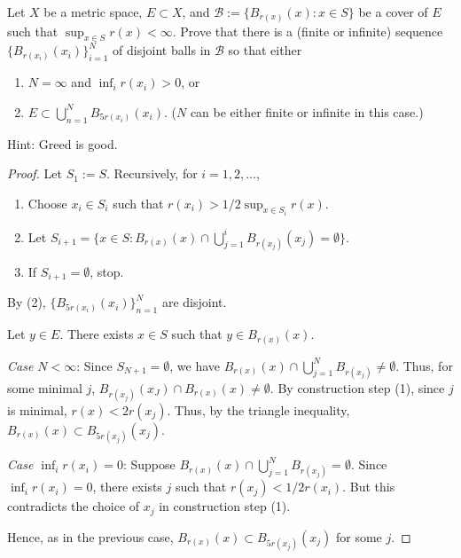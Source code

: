 \documentclass{article}
\begin{document}
 Let $X$ be a metric space, $E\subset X$, and $\mathcal B := \{B_{r(x)}(x) : x \in S \}$ be a cover of $E$ such that $\sup_{x\in S} r(x) < \infty$. Prove that there is a (finite or infinite) sequence $\{B_{r(x_i)}(x_i)\}_{i=1}^N$ of disjoint balls in $\mathcal B$ so that either
\begin{enumerate}
\item $N = \infty$ and $\inf_i r(x_i) > 0$, or
\item $E \subset \bigcup_{n=1}^N B_{5r(x_i)}(x_i)$. ($N$ can be either finite or infinite in this case.)
\end{enumerate}
Hint: Greed is good.
\begin{proof}
Let $S_1 := S$. Recursively, for $i = 1, 2, \ldots$,
\begin{enumerate}
\item Choose $x_i \in S_i$ such that $r(x_i) > 1/2 \sup_{x\in S_i} r(x)$.
\item Let $S_{i+1} =  \{x\in S : B_{r(x)}(x) \cap \bigcup_{j=1}^i B_{r(x_j)} (x_j) = \emptyset\}$.
\item If $S_{i+1} = \emptyset$, stop.
\end{enumerate}
By (2), $\{B_{5r(x_i)}(x_i)\}_{n=1}^N$ are disjoint.

Let $y \in E$. There exists $x \in S$ such that $y\in B_{r(x)}(x)$.

\emph{Case $N < \infty$}:  Since $S_{N+1} = \emptyset$, we have $B_{r(x)}(x) \cap \bigcup_{j=1}^N B_{r(x_j)} \ne  \emptyset$. Thus, for some minimal $j$, $B_{r(x_j)}(x_J) \cap B_{r(x)}(x) \ne \emptyset$. By construction step (1), since $j$ is minimal, $r(x) < 2r(x_j)$. Thus, by the triangle inequality, $B_{r(x)}(x) \subset B_{5r(x_j)}(x_j)$.

\emph{Case $\inf_i r(x_i) = 0$}: Suppose $B_{r(x)}(x) \cap \bigcup_{j=1}^N B_{r(x_j)} =  \emptyset$. Since $\inf_i r(x_i) = 0$, there exists $j$ such that $r(x_j) < 1/2 r(x_i)$.  But this contradicts the choice of $x_j$ in construction step (1).

Hence, as in the previous case, $B_{r(x)}(x) \subset B_{5r(x_j)}(x_j)$ for some $j$.

\end{proof}
\end{document}
